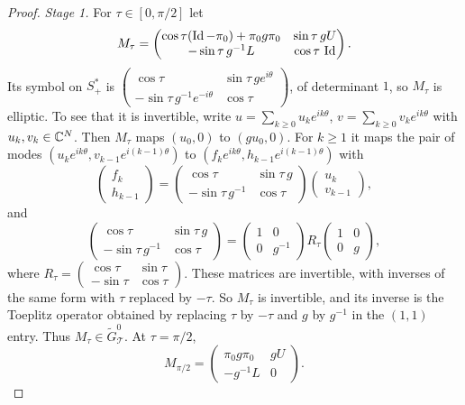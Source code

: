 \begin{proof}
  \emph{Stage 1.} For $\tau\in[0,\pi/2]$ let
  \begin{equation*}
    M_\tau=\begin{pmatrix}\cos\tau(\operatorname{Id}-\pi_0)+\pi_0g\pi_0&\sin\tau\,gU\\
    -\sin\tau\,g^{-1}L&\cos\tau\,\operatorname{Id}\end{pmatrix}.
  \end{equation*}
  Its symbol on $S^*_+$ is
  $\left(\begin{smallmatrix}\cos\tau&\sin\tau\,ge^{i\theta}\\
  -\sin\tau\,g^{-1}e^{-i\theta}&\cos\tau\end{smallmatrix}\right)$, of
  determinant $1$, so $M_\tau$ is elliptic. To see that it is invertible,
  write $u=\sum_{k\ge0}u_ke^{ik\theta}$, $v=\sum_{k\ge0}v_ke^{ik\theta}$ with
  $u_k,v_k\in\mathbb{C}^N$. Then $M_\tau$ maps $(u_0,0)$ to $(gu_0,0)$. For $k\ge1$ it
  maps the pair of modes $(u_ke^{ik\theta},v_{k-1}e^{i(k-1)\theta})$ to
  $(f_ke^{ik\theta},h_{k-1}e^{i(k-1)\theta})$ with
  \begin{equation*}
    \begin{pmatrix}f_k\\h_{k-1}\end{pmatrix}=
    \begin{pmatrix}\cos\tau&\sin\tau\,g\\-\sin\tau\,g^{-1}&\cos\tau\end{pmatrix}
    \begin{pmatrix}u_k\\v_{k-1}\end{pmatrix},
  \end{equation*}
  and
  \begin{equation*}
    \begin{pmatrix}\cos\tau&\sin\tau\,g\\-\sin\tau\,g^{-1}&\cos\tau\end{pmatrix}
    =\begin{pmatrix}1&0\\0&g^{-1}\end{pmatrix}R_\tau
    \begin{pmatrix}1&0\\0&g\end{pmatrix},
  \end{equation*}
  where
  $R_\tau=\left(\begin{smallmatrix}\cos\tau&\sin\tau\\-\sin\tau&\cos\tau
  \end{smallmatrix}\right)$. These matrices are invertible, with inverses of
  the same form with $\tau$ replaced by $-\tau$. So $M_\tau$ is invertible, and
  its inverse is the Toeplitz operator obtained by replacing $\tau$ by $-\tau$
  and $g$ by $g^{-1}$ in the $(1,1)$ entry. Thus $M_\tau\in\tilde
  G^0_{\mathcal T}$. At $\tau=\pi/2$,
  \begin{equation*}
    M_{\pi/2}=\begin{pmatrix}\pi_0g\pi_0&gU\\-g^{-1}L&0\end{pmatrix}.
  \end{equation*}


\end{proof}

